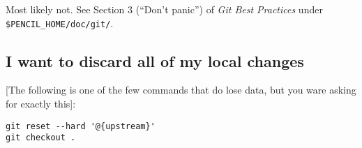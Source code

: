 \documentclass[12pt,pdftex]{article}
\begin{document}
Most likely not. See Section 3 (“Don't panic”) of \emph{Git Best Practices} under
\texttt{\$PENCIL\_HOME/doc/git/}.


\subsection{I want to discard all of my local changes}
\label{sec-3-3}

[The following is one of the few commands that do lose data, but you
ware asking for exactly this]:
\lstset{frame=single,basicstyle=\ttfamily\footnotesize,language=sh,label= ,caption= ,captionpos=b,numbers=none}
\begin{lstlisting}
git reset --hard '@{upstream}'
git checkout .
\end{lstlisting}
\end{document}
